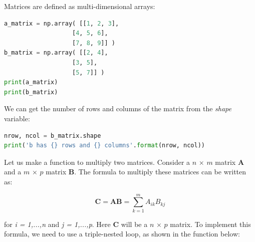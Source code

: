 \documentclass[a4paper , 12pt]{book}
\begin{document}
Matrices are defined as multi-dimensional arrays:

\begin{center}
\begin{lstlisting}[language=Python, frame=single]
a_matrix = np.array( [[1, 2, 3], 
                   [4, 5, 6], 
                   [7, 8, 9]] )
b_matrix = np.array( [[2, 4],
                   [3, 5],
                   [5, 7]] )
print(a_matrix)
print(b_matrix)
\end{lstlisting}
\end{center}

We can get the number of rows and columns of the matrix from the \textit{shape} variable:

\begin{center}
\begin{lstlisting}[language=Python, frame=single]
nrow, ncol = b_matrix.shape
print('b has {} rows and {} columns'.format(nrow, ncol))
\end{lstlisting}
\end{center}

Let us make a function to multiply two matrices. Consider a $n$ $\times$ $m$ matrix \textbf{A} and a $m$ $\times$ $p$ matrix \textbf{B}. The formula to multiply these matrices can be written as:

\begin{equation}
    \textbf{C} = \textbf{AB} =\sum_{k=1}^m A_{ik}B_{kj}
\end{equation}

for \textit{i = 1,...,n} and \textit{j = 1,...,p}. Here \textbf{C} will be a $n$ $\times$ $p$ matrix. To implement this formula, we need to use a triple-nested loop, as shown in the function below:
\end{document}
